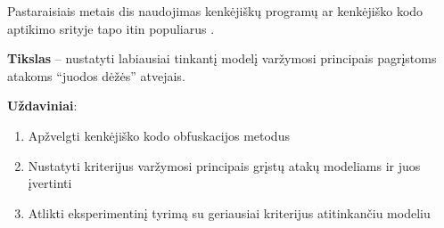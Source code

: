 
Pastaraisiais metais \acfp{di} naudojimas kenkėjiškų programų ar kenkėjiško kodo aptikimo srityje tapo itin populiarus \citeplace.

\textbf{Tikslas} -- nustatyti labiausiai tinkantį modelį varžymosi principais pagrįstoms atakoms \enquote{juodos dėžės} atvejais.

\vspace{10pt}
\textbf{Uždaviniai}:
\begin{enumerate}
    \item Apžvelgti kenkėjiško kodo obfuskacijos metodus
    \item Nustatyti kriterijus varžymosi principais grįstų atakų modeliams ir juos įvertinti
    \item Atlikti eksperimentinį tyrimą su geriausiai kriterijus atitinkančiu modeliu
\end{enumerate}
